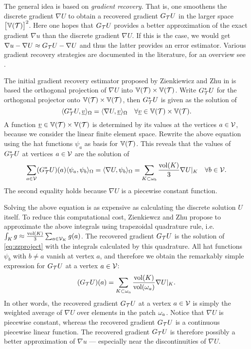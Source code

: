 \documentclass[thesis.tex]{subfiles}
\begin{document}
The general idea is based on \emph{gradient recovery}. That is, one smoothens the discrete gradient $\nabla U$ to obtain a
recovered gradient $G_{\mathcal{T}} U$ in the larger space $\left[\mathbb{V}(\mathcal{T})\right]^2$. Here
one hopes that $G_{\mathcal{T}} U$ provides a better approximation of the exact gradient $\nabla u$ than the discrete gradient $\nabla U$.
If this is the case, we would get $\nabla u - \nabla U \approx G_{\mathcal{T}} U - \nabla U$ and thus the latter provides
an error estimator.  
Various gradient recovery strategies are documented in the literature, for an overview see \cite{zienkiewicz1992superconvergent}. 

The initial gradient recovery estimator proposed by Zienkiewicz and Zhu in \cite{zienkiewicz1987simple} is based
the orthogonal projection of $\nabla U$ into $\mathbb{V}(\mathcal{T}) \times \mathbb{V}(\mathcal{T})$. Write $G_{\mathcal{T}}^*U$ for the orthogonal
projector onto $\mathbb{V}(\mathcal{T}) \times \mathbb{V}(\mathcal{T})$, then $G_{\mathcal{T}}^*U$ is given as the solution of
\[
  \langle G_{\mathcal{T}}^*U, \underline{v}  \rangle_\Omega = \langle \nabla U,\underline{v} \rangle_\Omega \quad \forall \underline{v} \in \mathbb{V}(\mathcal{T}) \times \mathbb{V}(\mathcal{T}).
\]
A function $\underline{v} \in \mathbb{V}(\mathcal{T}) \times \mathbb{V}(\mathcal{T})$ is determined by its values at the vertices $a \in \mathcal{V}$,
because we consider the linear finite element space. Rewrite the above equation using the hat functions $\psi_a$ as basis for $\mathbb{V}(\mathcal{T})$.
This reveals that the values of $G_{\mathcal{T}}^*U$ at vertices $a \in \mathcal{V}$  are the solution of 
\begin{equation}
  \label{eq:zzproject}
  \sum_{a \in \mathcal{V}} (G_{\mathcal{T}}^* U)(a) \langle \psi_a, \psi_b \rangle_\Omega = \langle \nabla U, \psi_b \rangle_{\Omega} = \sum_{K \subset \omega_b} \frac{\operatorname{vol}(K)}{3} \nabla U|_K \quad \forall b \in \mathcal{V}.
\end{equation}
The second equality holds because $\nabla U$ is a piecewise constant function.

Solving the above equation is as expensive as calculating the discrete solution $U$ itself. To
reduce this computational cost, Zienkiewcz and Zhu \cite{zienkiewicz1987simple} propose to approximate the
above integrals using trapezoidal quadrature rule, i.e.~$\int_K g \approx \frac{\operatorname{vol}(K)}{3} \sum_{a \in \mathcal{V}_K} g(a)$. 
The recovered gradient $G_{\mathcal{T}} U$ is the solution of \eqref{eq:zzproject} with the integrals calculated by this quadrature.
All hat functions $\psi_b$ with $b\ne a$ vanish at vertex $a$, and therefore we obtain the remarkably simple expression
for $G_{\mathcal{T}} U$ at a vertex $a \in \mathcal{V}$:
\[
  (G_{\mathcal{T}} U)(a) = \sum_{K \subset \omega_a} \frac{\operatorname{vol}(K)}{\operatorname{vol}(\omega_a)} \nabla U|_K.
\]
In other words, the recovered gradient $G_{\mathcal{T}} U$ at a vertex $a \in \mathcal{V}$ is simply the weighted average of $\nabla U$ over
elements in the patch $\omega_a$. Notice that $\nabla U$ is piecewise constant, whereas
the recovered gradient $G_{\mathcal{T}} U$ is a continuous piecewise linear function. The recovered gradient $G_{\mathcal{T}} U$ is 
therefore possibly a better approximation of $\nabla u$ --- especially near the discontinuities of $\nabla U$.
\end{document}
